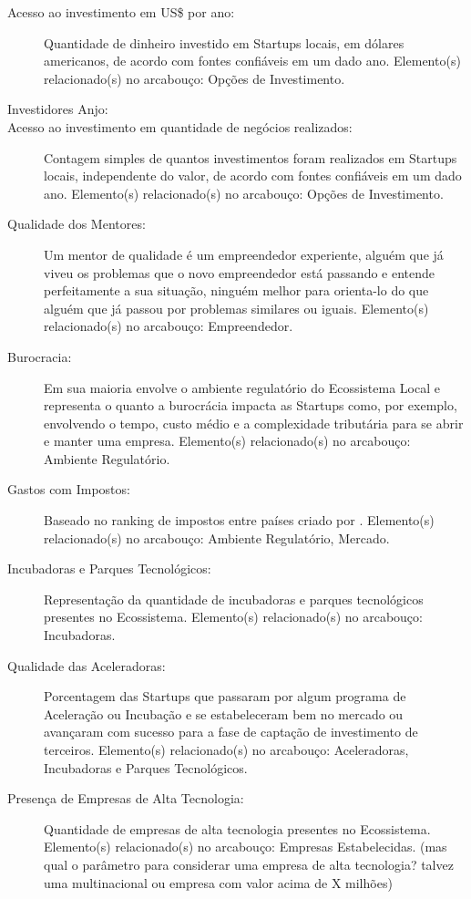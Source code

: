 \begin{description}
  \item [Acesso ao investimento em US\$ por ano:] Quantidade de dinheiro investido em Startups locais, em dólares americanos, de acordo com fontes confiáveis em um dado ano. Elemento(s) relacionado(s) no arcabouço: Opções de Investimento. 

  \item [Investidores Anjo: ]

  \item [Acesso ao investimento em quantidade de negócios realizados:] Contagem simples de quantos investimentos foram realizados em Startups locais, independente do valor, de acordo com fontes confiáveis em um dado ano. Elemento(s) relacionado(s) no arcabouço: Opções de Investimento.

  \item [Qualidade dos Mentores:] Um mentor de qualidade é um empreendedor experiente, alguém que já viveu os problemas que o novo empreendedor está passando e entende perfeitamente a sua situação, ninguém melhor para orienta-lo do que alguém que já passou por problemas similares ou iguais. Elemento(s) relacionado(s) no arcabouço: Empreendedor.

  \item [Burocracia:] Em sua maioria envolve o ambiente regulatório do Ecossistema Local e representa o quanto a burocrácia impacta as Startups como, por exemplo, envolvendo o tempo, custo médio e a complexidade tributária para se abrir e manter uma empresa. Elemento(s) relacionado(s) no arcabouço: Ambiente Regulatório.

  \item [Gastos com Impostos:] Baseado no ranking de impostos entre países criado por . Elemento(s) relacionado(s) no arcabouço: Ambiente Regulatório, Mercado. 

  \item [Incubadoras e Parques Tecnológicos:] Representação da quantidade de incubadoras e parques tecnológicos presentes no Ecossistema. Elemento(s) relacionado(s) no arcabouço: Incubadoras.

  \item [Qualidade das Aceleradoras:] Porcentagem das Startups que passaram por algum programa de Aceleração ou Incubação e se estabeleceram bem no mercado ou avançaram com sucesso para a fase de captação de investimento de terceiros. Elemento(s) relacionado(s) no arcabouço: Aceleradoras, Incubadoras e Parques Tecnológicos.

  \item [Presença de Empresas de Alta Tecnologia:] Quantidade de empresas de alta tecnologia presentes no Ecossistema. Elemento(s) relacionado(s) no arcabouço: Empresas Estabelecidas. (mas qual o parâmetro para considerar uma empresa de alta tecnologia? talvez uma multinacional ou empresa com valor acima de X milhões)


\end{description}
